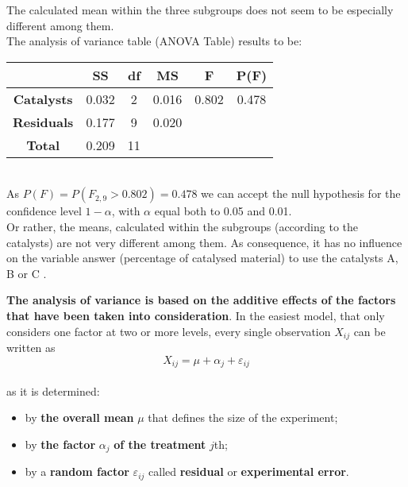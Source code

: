 \begin{frame}
  \begin{small}
    \vspace*{.25cm} 
    The calculated mean within the three subgroups does not seem to be especially different among them.\\
    The analysis of variance table (ANOVA Table) results to be:\\
    \vspace*{.5cm}
    \hspace*{.75cm}
    \begin{tabular}{|c|c|c|c|c|c|}
      \cline{2-6}
      \multicolumn{1}{c|}{\hspace*{3.5cm}}  & \textbf{SS}  & \textbf{df} & \textbf{MS}  & \textbf{F}  &  \textbf{P(F)} \\ \hline
      \textbf{Catalysts}  & 0.032  & 2  &  0.016 &  0.802 & 0.478 \\ \hline
      \textbf{Residuals}  &  0.177 & 9  & 0.020  &   &   \\ \hline
      \textbf{Total}  & 0.209  & 11  &   &   &   \\ \hline
    \end{tabular}\\
    \vspace*{.5cm}
    As $ P(F) = P(F_{2, 9} > 0.802) = 0.478 $ we can accept the null hypothesis for the confidence level  {\boldmath$1-\alpha$}, with {\boldmath$\alpha$} equal both to 0.05 and 0.01.\\
    \vspace*{.25cm}
    Or rather, the means, calculated within the subgroups (according to the catalysts) are not very different among them. As consequence, it has no influence on the variable answer (percentage of catalysed material) to use the catalysts A, B or C  .
  \end{small}
\end{frame}


\begin{frame}
  \vspace*{.25cm} 
  \textbf{The analysis of variance is based on the additive effects of the factors that have been taken into consideration}. In the easiest model, that only considers one factor at two or more levels, every single observation {\boldmath$X_{ij}$} can be written as
  $$ X_{ij} = \mu + \alpha_j + \varepsilon_{ij} $$\\
  \vspace*{.15cm}
  as it is determined:
  \begin{itemize}
    \item by \textbf{the overall mean} {\boldmath$\mu$} that defines the size of the experiment;
    \item by \textbf{the factor} {\boldmath$\alpha_j$} \textbf{of the treatment} $ j $th;
    \item by a \textbf{random factor}  {\boldmath$\varepsilon_{ij}$} called \textbf{residual} or \textbf{experimental error}.
  \end{itemize}
\end{frame}

